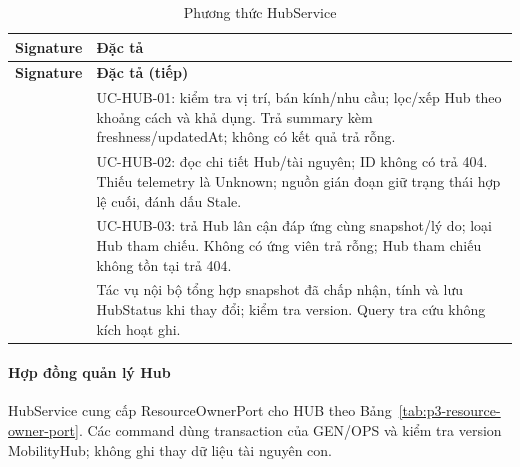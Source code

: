 
\begin{longtable}{|L{58mm}|L{81mm}|}
\caption{Phương thức HubService}\\\hline
\textbf{Signature} & \textbf{Đặc tả}\\\hline
\endfirsthead
\hline\textbf{Signature} & \textbf{Đặc tả (tiếp)}\\\hline\endhead
{} & UC-HUB-01: kiểm tra vị trí, bán kính/nhu cầu; lọc/xếp Hub theo khoảng cách và khả dụng. Trả summary kèm freshness/updatedAt; không có kết quả trả rỗng.\\\hline
{} & UC-HUB-02: đọc chi tiết Hub/tài nguyên; ID không có trả 404. Thiếu telemetry là Unknown; nguồn gián đoạn giữ trạng thái hợp lệ cuối, đánh dấu Stale.\\\hline
{} & UC-HUB-03: trả Hub lân cận đáp ứng cùng snapshot/lý do; loại Hub tham chiếu. Không có ứng viên trả rỗng; Hub tham chiếu không tồn tại trả 404.\\\hline
{} & Tác vụ nội bộ tổng hợp snapshot đã chấp nhận, tính và lưu HubStatus khi thay đổi; kiểm tra version. Query tra cứu không kích hoạt ghi.\\\hline
\end{longtable}

\paragraph{Hợp đồng quản lý Hub}
HubService cung cấp ResourceOwnerPort cho HUB theo Bảng~\ref{tab:p3-resource-owner-port}. Các command dùng transaction của GEN/OPS và kiểm tra version MobilityHub; không ghi thay dữ liệu tài nguyên con.

